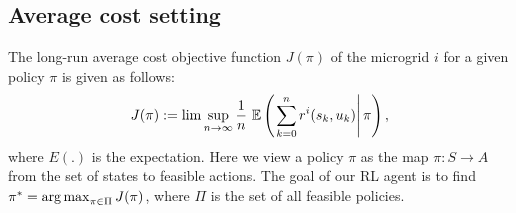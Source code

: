 \subsection{Average cost setting} \label{subsec:avg}
The long-run average cost objective function $J(\pi)$ of the microgrid $i$ for a given policy $\pi$ is given as follows:
\begin{align}
J(\pi) := \lim \sup_{n \rightarrow \infty}\frac{1}{n} \,\, \mathbb{E} \left(\left.\sum_{k = 0}^{n} r^{i} (s_{k},u_{k})\right|\pi \right),
\end{align}
where $E(.)$ is the expectation. Here we view a policy $\pi$ as the map $\pi : S \to A$ from the set of states to feasible actions. The goal of our RL agent is to find $\pi^* = \mathop{\rm arg\,max}_{\pi \in \Pi} J(\pi)$, where $\Pi$ is the set of all feasible policies.

%
%

